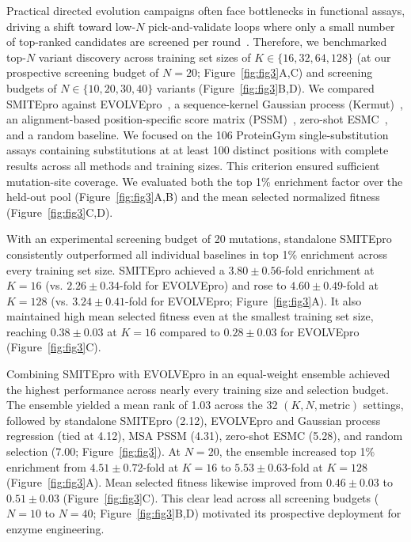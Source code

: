 \documentclass[sn-nature]{sn-jnl}
\begin{document}
Practical directed evolution campaigns often face bottlenecks in functional assays, driving a shift toward low-$N$ pick-and-validate loops where only a small number of top-ranked candidates are screened per round~\cite{chu2024accurate, yang2025active}. Therefore, we benchmarked top-$N$ variant discovery across training set sizes of $K \in \{16, 32, 64, 128\}$ (at our prospective screening budget of $N = 20$; Figure~\ref{fig:fig3}A,C) and screening budgets of $N \in \{10, 20, 30, 40\}$ variants (Figure~\ref{fig:fig3}B,D). We compared SMITEpro against EVOLVEpro~\cite{jiang2024rapid}, a sequence-kernel Gaussian process (Kermut)~\cite{groth2024kermut}, an alignment-based position-specific score matrix (PSSM)~\cite{gribskov1987profile}, zero-shot ESMC~\cite{esm2024cambrian}, and a random baseline. We focused on the 106 ProteinGym single-substitution assays containing substitutions at at least 100 distinct positions with complete results across all methods and training sizes. This criterion ensured sufficient mutation-site coverage. We evaluated both the top 1\% enrichment factor over the held-out pool (Figure~\ref{fig:fig3}A,B) and the mean selected normalized fitness (Figure~\ref{fig:fig3}C,D).

With an experimental screening budget of 20 mutations, standalone SMITEpro consistently outperformed all individual baselines in top 1\% enrichment across every training set size. SMITEpro achieved a $3.80 \pm 0.56$-fold enrichment at $K = 16$ (vs. $2.26 \pm 0.34$-fold for EVOLVEpro) and rose to $4.60 \pm 0.49$-fold at $K = 128$ (vs. $3.24 \pm 0.41$-fold for EVOLVEpro; Figure~\ref{fig:fig3}A). It also maintained high mean selected fitness even at the smallest training set size, reaching $0.38 \pm 0.03$ at $K = 16$ compared to $0.28 \pm 0.03$ for EVOLVEpro (Figure~\ref{fig:fig3}C).

Combining SMITEpro with EVOLVEpro in an equal-weight ensemble achieved the highest performance across nearly every training size and selection budget. The ensemble yielded a mean rank of 1.03 across the 32 $(K, N, \text{metric})$ settings, followed by standalone SMITEpro (2.12), EVOLVEpro and Gaussian process regression (tied at 4.12), MSA PSSM (4.31), zero-shot ESMC (5.28), and random selection (7.00; Figure~\ref{fig:fig3}). At $N = 20$, the ensemble increased top 1\% enrichment from $4.51 \pm 0.72$-fold at $K = 16$ to $5.53 \pm 0.63$-fold at $K = 128$ (Figure~\ref{fig:fig3}A). Mean selected fitness likewise improved from $0.46 \pm 0.03$ to $0.51 \pm 0.03$ (Figure~\ref{fig:fig3}C). This clear lead across all screening budgets ($N = 10$ to $N = 40$; Figure~\ref{fig:fig3}B,D) motivated its prospective deployment for enzyme engineering.
\end{document}
